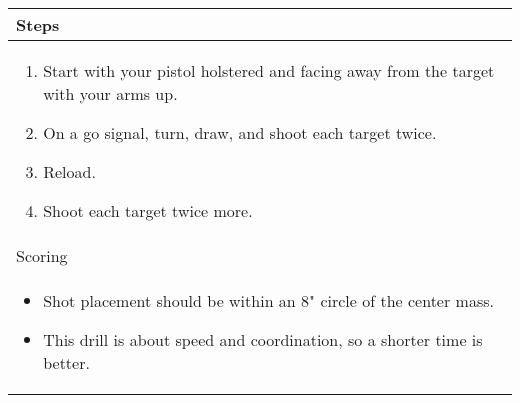 \documentclass[../Cover.tex]{subfiles}
\begin{document}
	\begin{tabular}{ | p{} |}
		\hline
		Steps\\ 
		\hline
		\tiny \begin{enumerate}[topsep=0pt, partopsep=0pt]
			\item Start with your pistol holstered and facing away from the target with your arms up.
			\item On a go signal, turn, draw, and shoot each target twice.
			\item Reload.
			\item Shoot each target twice more.
		\end{enumerate}		
		\\ [0.25\textheight]
		\hline
		Scoring \\
		\hline
		\tiny \begin{itemize}[topsep=0pt, partopsep=0pt]
			\item Shot placement should be within an 8" circle of the center mass.
			\item This drill is about speed and coordination, so a shorter time is better.
		\end{itemize}		
		\\ [0.25\textheight]
		\hline
	\end{tabular}
\end{document}
